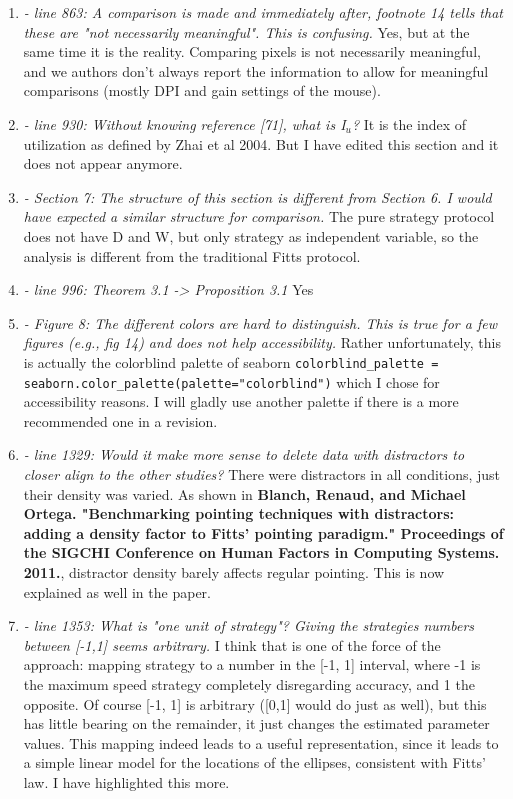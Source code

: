 \documentclass{article}
\begin{document}
\begin{enumerate}
    \item \textit{- line 863: A comparison is made and immediately after, footnote 14 tells that these are "not necessarily meaningful". This is confusing. } Yes, but at the same time it is the reality. Comparing pixels is not necessarily meaningful, and we authors don't always report the information to allow for meaningful comparisons (mostly DPI and gain settings of the mouse).
    \item \textit{- line 930: Without knowing reference [71], what is I$_u$? }It is the index of utilization as defined by Zhai et al 2004. But I have edited this section and it does not appear anymore.
    \item \textit{- Section 7: The structure of this section is different from Section 6. I would have expected a similar structure for comparison. } The pure strategy protocol does not have D and W, but only strategy as independent variable, so the analysis is different from the traditional Fitts protocol.
    \item \textit{- line 996: Theorem 3.1 -> Proposition 3.1} Yes
    \item \textit{- Figure 8: The different colors are hard to distinguish. This is true for a few figures (e.g., fig 14) and does not help accessibility. } Rather unfortunately, this is actually the colorblind palette of seaborn \verb#colorblind_palette =# \verb#seaborn.color_palette(palette="colorblind")# which I chose for accessibility reasons. I will gladly use another palette if there is a more recommended one in a revision.
    \item \textit{- line 1329: Would it make more sense to delete data with distractors to closer align to the other studies? } There were distractors in all conditions, just their density was varied. As shown in \textbf{Blanch, Renaud, and Michael Ortega. "Benchmarking pointing techniques with distractors: adding a density factor to Fitts' pointing paradigm." Proceedings of the SIGCHI Conference on Human Factors in Computing Systems. 2011.}, distractor density barely affects regular pointing. This is now explained as well in the paper.
    \item \textit{- line 1353: What is "one unit of strategy"? Giving the strategies numbers between [-1,1] seems arbitrary. } I think that is one of the force of the approach: mapping strategy to a number in the [-1, 1] interval, where -1 is the maximum speed strategy completely disregarding accuracy, and 1 the opposite. Of course [-1, 1] is arbitrary ([0,1] would do just as well), but this has little bearing on the remainder, it just changes the estimated parameter values. This mapping indeed leads to a useful representation, since it leads to a simple linear model for the locations of the ellipses, consistent with Fitts' law. I have highlighted this more.

\end{enumerate}
\end{document}
